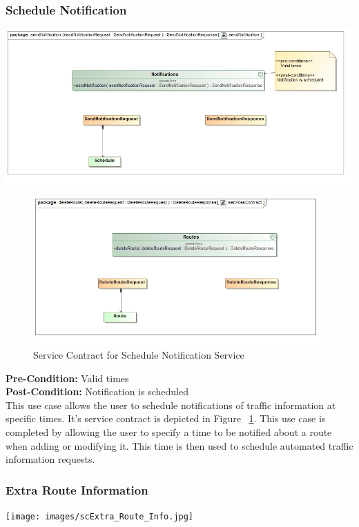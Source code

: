 \documentclass[a4paper,12pt]{article}
\begin{document}
\subsubsection{Schedule Notification}
\includegraphics[width=\textwidth]{images/scSchedule_Notification.jpg}
\begin{figure}[ht]
\includegraphics[width=\textwidth]{images/scDelete_Route.jpg}
\caption{Service Contract for Schedule Notification Service}
\label{fig:sc_notification}
\end{figure}

\textbf{Pre-Condition: }
Valid times\\
\textbf{Post-Condition: }
Notification is scheduled\\

This use case allows the user to schedule notifications of traffic information at specific times. It's service contract is depicted in Figure ~\ref{fig:sc_notification}. This use case is completed by allowing the user to specify a time to be notified about a route when adding or modifying it. This time is then used to schedule automated traffic information requests.

\subsubsection{Extra Route Information}
\texttt{[image: images/scExtra\_Route\_Info.jpg]}
\end{document}
